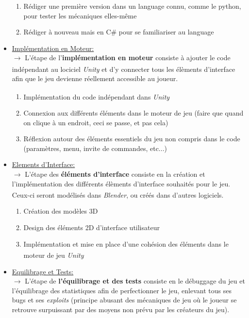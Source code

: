 \documentclass{article}
\def\reg{\small{\textsuperscript{\textregistered}}}
\begin{document}
\begin{itemize}
                \begin{enumerate}
                    \item Rédiger une première version dans un language connu, comme le python, pour tester les mécaniques elles-même
                    \item Rédiger à nouveau mais en C\# pour se familiariser au language
                \end{enumerate}
            \item \underline{Implémentation en Moteur:}\\
                $\rightarrow$ L'étape de l'\textbf{implémentation en moteur} consiste à ajouter le code indépendant au lociciel \textit{Unity\reg} et d'y connecter tous les élèments d'interface afin que le jeu devienne réellement accessible au joueur.
                \begin{enumerate}
                    \item Implémentation du code indépendant dans \textit{Unity\reg}
                    \item Connexion aux différents éléments dans le moteur de jeu (faire que quand on clique à un endroit, ceci se passe, et pas cela)
                    \item Réflexion autour des éléments essentiels du jeu non compris dans le code (paramètres, menu, invite de commandes, etc...)
                \end{enumerate}
            \item \underline{Elements d'Interface:}\\
                $\rightarrow$ L'étape des \textbf{éléments d'interface} consiste en la création et l'implémentation des différents élèments d'interface souhaités pour le jeu. Ceux-ci seront modélisés dans \textit{Blender\reg}, ou créés dans d'autres logiciels.
                \begin{enumerate}
                    \item Création des modèles 3D
                    \item Design des éléments 2D d'interface utilisateur
                    \item Implémentation et mise en place d'une cohésion des éléments dans le moteur de jeu \textit{Unity\reg}
                \end{enumerate}
            \item \underline{Equilibrage et Tests:}\\
                $\rightarrow$ L'étape de \textbf{l'équilibrage et des tests} consiste en le débuggage du jeu et l'équilibrage des statistiques afin de perfectionner le jeu, enlevant tous ses bugs et ses \textit{exploits} (principe abusant des mécaniques de jeu où le joueur se retrouve surpuissant par des moyens non prévu par les créateurs du jeu).

\end{itemize}
\end{document}
